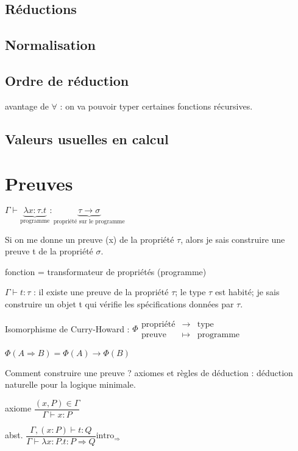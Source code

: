 \documentclass[10pt,a4paper]{article}
\begin{document}
\subsection{Réductions}

\subsection{Normalisation}

\subsection{Ordre de réduction}
avantage de $\forall$ : on va pouvoir typer certaines fonctions récursives.

\subsection{Valeurs usuelles en \lambda calcul}

\section{Preuves}
$
\Gamma \vdash \underbrace{\lambda x : \tau . t}_{\text{programme}} : \underbrace{\tau → \sigma}_{\text{propriété sur le programme}}$

Si on me donne un preuve (x) de la propriété $\tau$, alors je sais construire une preuve t de la propriété $\sigma$.

fonction = transformateur de propriétés (programme)

$\Gamma \vdash t  : \tau$  : il existe une preuve de la propriété $\tau$; le type  $\tau$ est habité; je sais construire un objet t qui vérifie les spécifications données par $\tau$.

Isomorphisme de Curry-Howard :
$\Phi
\begin{array}{lll}
\text{propriété}& → & \text{type} \\
\text{preuve} &\mapsto&  \text{programme}
\end{array}$

$\Phi(A \Rightarrow B) = \Phi(A) → \Phi(B)$

Comment construire une preuve ?
axiomes et règles de déduction : déduction naturelle pour la logique minimale.

axiome $\dfrac{(x,P) \in \Gamma}{\Gamma \vdash x: P}$

abst. $\dfrac{\Gamma, (x:P) \vdash t:Q}{\Gamma  \vdash \lambda x:P.t : P \Rightarrow Q} \text{intro}_{\Rightarrow}$
\end{document}
